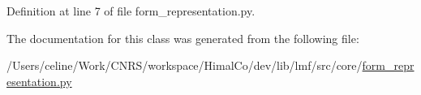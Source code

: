Definition at line 7 of file form\+\_\+representation.\+py.



The documentation for this class was generated from the following file\+:\begin{DoxyCompactItemize}
\item 
/\+Users/celine/\+Work/\+C\+N\+R\+S/workspace/\+Himal\+Co/dev/lib/lmf/src/core/\hyperlink{form__representation_8py}{form\+\_\+representation.\+py}\end{DoxyCompactItemize}
